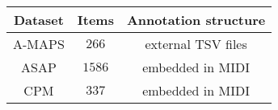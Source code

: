 \begin{tabular}{ccc}
    \textbf{Dataset} & \textbf{Items} & \textbf{Annotation structure} \\\hline
    A-MAPS           & $266$          & external TSV files            \\
    ASAP             & $1586$         & embedded in MIDI              \\
    CPM              & $337$          & embedded in MIDI
\end{tabular}
